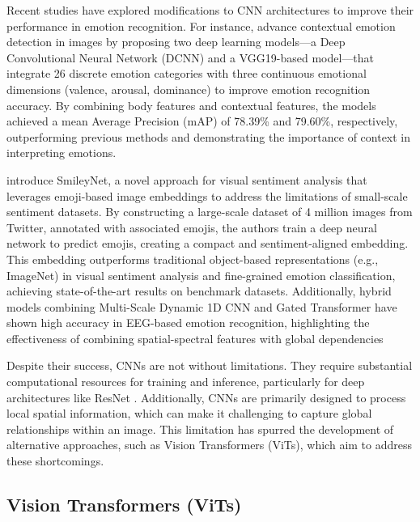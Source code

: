 Recent studies have explored modifications to CNN architectures to improve their performance in emotion recognition. For instance, \citet{limami_contextual_2024} advance contextual emotion detection in images by proposing two deep learning models—a Deep Convolutional Neural Network (DCNN) and a VGG19-based model—that integrate 26 discrete emotion categories with three continuous emotional dimensions (valence, arousal, dominance) to improve emotion recognition accuracy. By combining body features and contextual features, the models achieved a mean Average Precision (mAP) of 78.39\% and 79.60\%, respectively, outperforming previous methods and demonstrating the importance of context in interpreting emotions.
\newline

\citet{al-halah2020} introduce SmileyNet, a novel approach for visual sentiment analysis that leverages emoji-based image embeddings to address the limitations of small-scale sentiment datasets. By constructing a large-scale dataset of 4 million images from Twitter, annotated with associated emojis, the authors train a deep neural network to predict emojis, creating a compact and sentiment-aligned embedding. This embedding outperforms traditional object-based representations (e.g., ImageNet) in visual sentiment analysis and fine-grained emotion classification, achieving state-of-the-art results on benchmark datasets. Additionally, hybrid models combining Multi-Scale Dynamic 1D CNN and Gated Transformer have shown high accuracy in EEG-based emotion recognition, highlighting the effectiveness of combining spatial-spectral features with global dependencies \cite{cheng_eeg-based_2024}
\newline

Despite their success, CNNs are not without limitations. They require substantial computational resources for training and inference, particularly for deep architectures like ResNet \cite{he2015deepresiduallearningimage}. Additionally, CNNs are primarily designed to process local spatial information, which can make it challenging to capture global relationships within an image. This limitation has spurred the development of alternative approaches, such as Vision Transformers (ViTs), which aim to address these shortcomings.

\subsection*{Vision Transformers (ViTs)}

